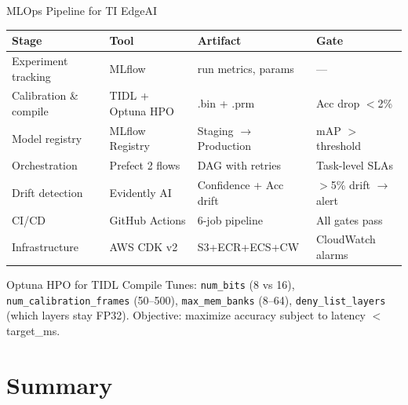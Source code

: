 \documentclass[aspectratio=169]{beamer}
\begin{document}
\begin{frame}{MLOps Pipeline for TI EdgeAI}
\small
\begin{tabular}{llll}
\toprule
\textbf{Stage} & \textbf{Tool} & \textbf{Artifact} & \textbf{Gate}\\
\midrule
Experiment tracking & MLflow & run metrics, params & ---\\
Calibration \& compile & TIDL + Optuna HPO & .bin + .prm & Acc drop $<$2\%\\
Model registry & MLflow Registry & Staging $\to$ Production & mAP $>$ threshold\\
Orchestration & Prefect 2 flows & DAG with retries & Task-level SLAs\\
Drift detection & Evidently AI & Confidence + Acc drift & $>$5\% drift $\to$ alert\\
CI/CD & GitHub Actions & 6-job pipeline & All gates pass\\
Infrastructure & AWS CDK v2 & S3+ECR+ECS+CW & CloudWatch alarms\\
\bottomrule
\end{tabular}
\vspace{0.3cm}
\begin{block}{Optuna HPO for TIDL Compile}
\footnotesize Tunes: \texttt{num\_bits} (8 vs 16), \texttt{num\_calibration\_frames} (50--500), \texttt{max\_mem\_banks} (8--64), \texttt{deny\_list\_layers} (which layers stay FP32). Objective: maximize accuracy subject to latency $<$ target\_ms.
\end{block}
\end{frame}

\section{Summary}
\end{document}
